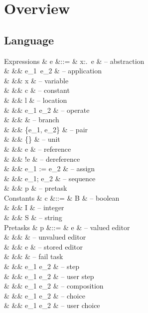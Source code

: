 
\section{Overview}

\statefultrue


\subsection{Language}

\begin{grammar}
  Expressions
    & e    &::= & \lambda x:\tau.\ e   & – abstraction \\
    &      &\mid& e_1\ e_2             & – application \\
    &      &\mid& x                    & – variable \\
    &      &\mid& c                    & – constant \\
    &      &\mid& l                    & – location \\
  \addlinespace
    &      &\mid& e_1 \star e_2        & – operate \\
    &      &\mid&    & – branch \\
    &      &\mid& \{e_1, e_2\}         & – pair \\
    &      &\mid& \{\}                 & – unit \\
  \addlinespace
    &      &\mid& \Ref e               & – reference \\
    &      &\mid& !e                   & – dereference \\
    &      &\mid& e_1 := e_2           & – assign \\
    &      &\mid& e_1; e_2             & – sequence \\
  \addlinespace
    &      &\mid& p                    & – pretask \\
  \addlinespace
  Constants
    & c    &::= & B                    & – boolean \\
    &      &\mid& I                    & – integer \\
    &      &\mid& S                    & – string \\
  \addlinespace
  Pretasks
    & p    &::= & \Edit e              & – valued editor \\
    &      &\mid& \Enter \beta         & – unvalued editor \\
    &      &\mid& \Store e             & – stored editor \\
  \addlinespace
    &      &\mid& \Fail                & – fail task \\
  \addlinespace
    &      &\mid& e_1 \Then e_2        & – step \\
    &      &\mid& e_1 \Next e_2        & – user step \\
  \addlinespace
    &      &\mid& e_1 \And e_2         & – composition \\
  \addlinespace
    &      &\mid& e_1 \Or e_2          & – choice \\
    &      &\mid& e_1 \Xor e_2         & – user choice \\
\end{grammar}
